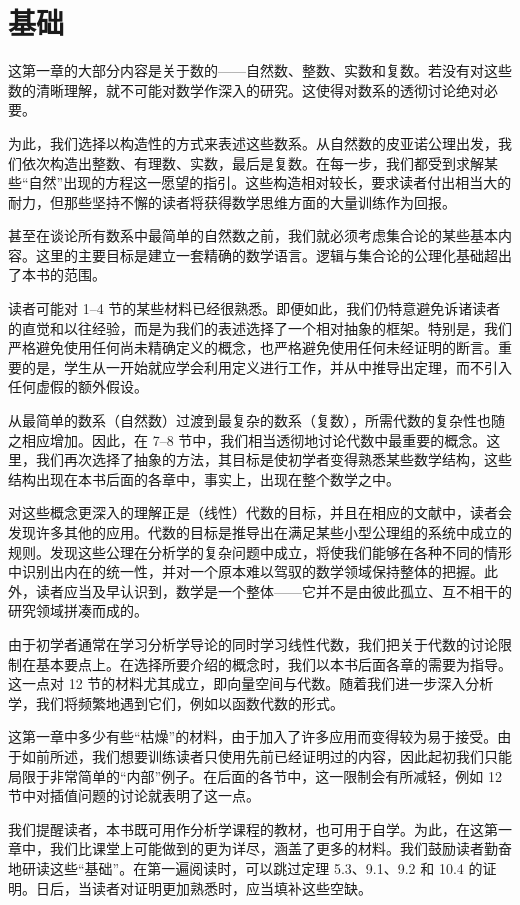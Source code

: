 \chapter{基础}
这第一章的大部分内容是关于数的——自然数、整数、实数和复数。若没有对这些数的清晰理解，就不可能对数学作深入的研究。这使得对数系的透彻讨论绝对必要。

为此，我们选择以构造性的方式来表述这些数系。从自然数的皮亚诺公理出发，我们依次构造出整数、有理数、实数，最后是复数。在每一步，我们都受到求解某些“自然”出现的方程这一愿望的指引。这些构造相对较长，要求读者付出相当大的耐力，但那些坚持不懈的读者将获得数学思维方面的大量训练作为回报。

甚至在谈论所有数系中最简单的自然数之前，我们就必须考虑集合论的某些基本内容。这里的主要目标是建立一套精确的数学语言。逻辑与集合论的公理化基础超出了本书的范围。

读者可能对 1–4 节的某些材料已经很熟悉。即便如此，我们仍特意避免诉诸读者的直觉和以往经验，而是为我们的表述选择了一个相对抽象的框架。特别是，我们严格避免使用任何尚未精确定义的概念，也严格避免使用任何未经证明的断言。重要的是，学生从一开始就应学会利用定义进行工作，并从中推导出定理，而不引入任何虚假的额外假设。

从最简单的数系（自然数）过渡到最复杂的数系（复数），所需代数的复杂性也随之相应增加。因此，在 7–8 节中，我们相当透彻地讨论代数中最重要的概念。这里，我们再次选择了抽象的方法，其目标是使初学者变得熟悉某些数学结构，这些结构出现在本书后面的各章中，事实上，出现在整个数学之中。

对这些概念更深入的理解正是（线性）代数的目标，并且在相应的文献中，读者会发现许多其他的应用。代数的目标是推导出在满足某些小型公理组的系统中成立的规则。发现这些公理在分析学的复杂问题中成立，将使我们能够在各种不同的情形中识别出内在的统一性，并对一个原本难以驾驭的数学领域保持整体的把握。此外，读者应当及早认识到，数学是一个整体——它并不是由彼此孤立、互不相干的研究领域拼凑而成的。

由于初学者通常在学习分析学导论的同时学习线性代数，我们把关于代数的讨论限制在基本要点上。在选择所要介绍的概念时，我们以本书后面各章的需要为指导。这一点对 12 节的材料尤其成立，即向量空间与代数。随着我们进一步深入分析学，我们将频繁地遇到它们，例如以函数代数的形式。

这第一章中多少有些“枯燥”的材料，由于加入了许多应用而变得较为易于接受。由于如前所述，我们想要训练读者只使用先前已经证明过的内容，因此起初我们只能局限于非常简单的“内部”例子。在后面的各节中，这一限制会有所减轻，例如 12 节中对插值问题的讨论就表明了这一点。

我们提醒读者，本书既可用作分析学课程的教材，也可用于自学。为此，在这第一章中，我们比课堂上可能做到的更为详尽，涵盖了更多的材料。我们鼓励读者勤奋地研读这些“基础”。在第一遍阅读时，可以跳过定理 5.3、9.1、9.2 和 10.4 的证明。日后，当读者对证明更加熟悉时，应当填补这些空缺。

